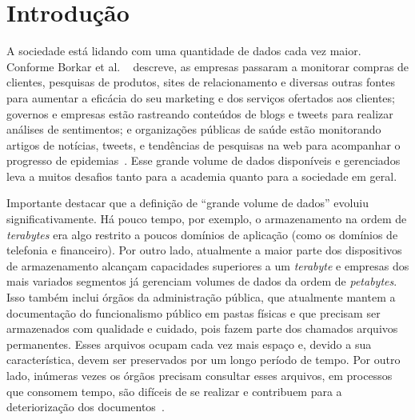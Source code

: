 \chapter{Introdução}
A sociedade está lidando com uma quantidade de dados cada vez maior. 
Conforme Borkar et al. ~\cite{WNextBigData} descreve, as empresas passaram a monitorar compras de clientes, pesquisas de produtos, sites de relacionamento e diversas outras fontes para aumentar a eficácia do seu marketing e dos serviços ofertados aos clientes; governos e empresas estão rastreando conteúdos de blogs e tweets para realizar análises de sentimentos; e organizações públicas de saúde estão monitorando artigos de notícias, tweets, e tendências de pesquisas na web para acompanhar o progresso de epidemias~\cite{WNextBigData}. Esse grande volume de dados disponíveis e gerenciados leva a muitos desafios tanto para a academia quanto para a sociedade em geral.

Importante destacar que a definição de ``grande volume de dados'' evoluiu significativamente. Há pouco tempo, por exemplo, o armazenamento na ordem de \emph{terabytes} era algo restrito a poucos domínios de aplicação (como os domínios de telefonia e financeiro). Por outro lado, atualmente a maior parte dos dispositivos de armazenamento alcançam capacidades superiores a um \emph{terabyte} e  empresas dos mais variados segmentos já gerenciam volumes de dados da ordem de \emph{petabytes}.
Isso também inclui órgãos da administração pública, que atualmente mantem a documentação do funcionalismo público em pastas físicas e que precisam ser armazenados com qualidade e cuidado, pois fazem parte dos chamados arquivos permanentes. Esses arquivos ocupam cada vez mais espaço e, devido a sua característica, devem ser preservados por um longo período de tempo. Por outro lado, inúmeras vezes os órgãos precisam consultar esses arquivos, em processos que consomem tempo, são difíceis de se realizar e contribuem para a deteriorização dos documentos~\cite{arqConarq}.

